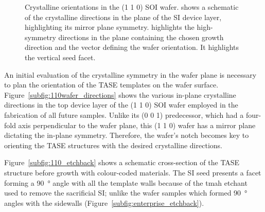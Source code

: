 \begin{figure}
{
    }
    \caption[Crystalline orientations in the \hkl(1 1 0) \acs{SOI} wafer.] {Crystalline orientations in the \hkl(1 1 0) \acs{SOI} wafer.  shows a schematic of the crystalline directions in the plane of the \acs{SI} device layer, highlighting its mirror plane symmetry.  highlights the high-symmetry directions in the  plane containing the chosen  growth direction and the \hkl[1 1 0] vector defining the wafer orientation. It highlights the vertical  seed facet.}
    \label{fig:110_wafer_properties}
\end{figure}

An initial evaluation of the crystalline symmetry in the wafer plane is necessary to plan the orientation of the \acs{TASE} templates on the wafer surface. Figure~\ref{subfig:110wafer_directions} shows the various in-plane crystalline directions in the top device layer of the \hkl(1 1 0) \acs{SOI} wafer employed in the fabrication of all future samples. Unlike its \hkl(0 0 1) predecessor, which had a four-fold axis perpendicular to the wafer plane, this \hkl(1 1 0) wafer has a mirror plane dictating the in-plane symmetry. Therefore, the wafer's notch becomes key to orienting the \acs{TASE} structures with the desired crystalline directions.
\par
Figure~\ref{subfig:110_etchback} shows a schematic cross-section of the \acs{TASE} structure before growth with colour-coded materials. The \acl{SI} seed presents a  facet forming a \qty{90}{\degree} angle with all the template walls because of the \acs{tmah} etchant used to remove the sacrificial \acl{SI}; unlike the  wafer samples which formed \qty{90}{\degree} angles with the sidewalls (Figure~\ref{subfig:enterprise_etchback}).

